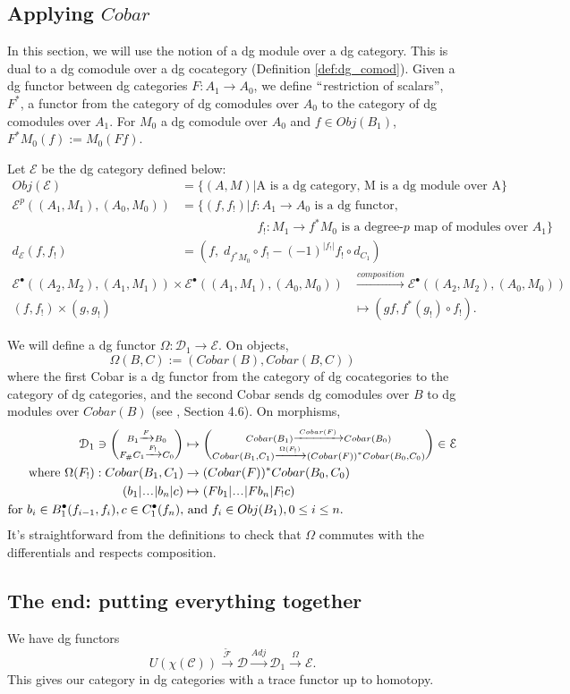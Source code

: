 \subsection{Applying $Cobar$}
\label{sec:cobar}
In this section, we will use the notion of 
a dg module over a dg category. This is 
dual to a dg comodule over 
a dg cocategory (Definition \ref{def:dg_comod}). 
Given a dg functor between dg categories 
$F:A_1 \to A_0$, we define $``$restriction 
of scalars'', $F^*$, a functor from 
the category of dg comodules over $A_0$ 
to the category of dg comodules over $A_1$. 
For $M_0$ a dg comodule over $A_0$ and $f \in 
Obj(B_1)$, $F^*M_0(f):=M_0(Ff)$.

Let $\mathcal{E}$ be the dg category defined 
below:
\begin{align*}
Obj(\mathcal{E}) 
&= 
\{(A,M) |
  \textrm{A is a dg category, 
  M is a dg module over A}\} \\
\mathcal{E}^p((A_1, M_1), (A_0, M_0))  
&= 
\{(f, f_!) | f:A_1 \to A_0 
  \textrm{ is a dg functor,}\\
& \phantom{{}=[(f, f_!)]{}}  
  f_!:M_1 \to f^*M_0 
  \textrm{ is a degree-$p$ map of modules over }
  A_1\}\\
d_{\mathcal{E}}(f,f_!)
&=
(f,\; d_{f^*M_0} \circ f_! - (-1)^{|f_!|} 
f_! \circ d_{C_1})  
\end{align*}
\begin{align*}  
\mathcal{E}^\bullet((A_2, M_2), (A_1, M_1)) \times  
\mathcal{E}^\bullet((A_1, M_1), (A_0, M_0))
&\xrightarrow{composition}
\mathcal{E}^\bullet((A_2, M_2), (A_0, M_0))\\
(f,f_!) \times (g, g_!)
&\mapsto
(gf, f^*(g_!)\circ f_!).
\end{align*}

We will define a dg functor $\Omega: 
\mathcal{D}_1 \to \mathcal{E}$. 
On objects, $$\Omega(B,C) := 
(Cobar(B), Cobar(B,C))$$ where the first 
Cobar is a dg functor from the category of 
dg cocategories to the category of dg 
categories, and the second Cobar sends 
dg comodules over $B$ to dg modules over 
$Cobar(B)$ (see \cite{T}, Section 4.6). 
On morphisms, 
\begin{align*}
\mathcal{D}_1 \ni
\bigg(\substack{
	B_1 \xrightarrow{F} B_0\\
	F_\# C_1 \xrightarrow{F_!} C_0}\bigg)
& \mapsto
\bigg(\substack{
  Cobar(B_1)\xrightarrow{Cobar(F)}Cobar(B_0)\\
  Cobar(B_1,C_1) \xrightarrow{\Omega(F_!)} 
  (Cobar(F))^*Cobar(B_0,C_0)}\bigg)
\in \mathcal{E}  \\
\textrm{where } 
\Omega(F_!): Cobar(B_1,C_1)
& \to
(Cobar(F))^*Cobar(B_0,C_0)\\
(b_1|\smdots|b_n|c)
&\mapsto
(Fb_1|\smdots|Fb_n|F_!c)\\
\textrm{for } 
  b_i \in B_1^\bullet(f_{i-1},f_i),
  c \in C_1^\bullet(f_n), 
&\textrm{ and } f_i \in 
  Obj(B_1), 0 \leq i \leq n.
\end{align*}
It's straightforward from the definitions 
to check that $\Omega$ commutes with 
the differentials and respects composition.

\subsection{The end: putting everything together}
We have dg functors
$$
U(\chi(\mathcal{C})) \xrightarrow{\tilde{\mathcal{F}}}
\mathcal{D} \xrightarrow{Adj}
\mathcal{D}_1 \xrightarrow{\Omega}
\mathcal{E}.
$$
This gives our category in dg categories with 
a trace functor up to homotopy.